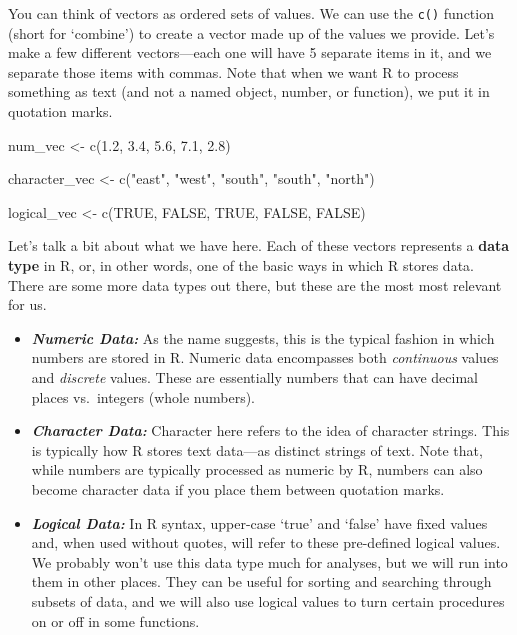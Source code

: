 \documentclass[
  letterpaper,
  DIV=11,
  numbers=noendperiod]{scrreprt}
\newenvironment{Shaded}{\begin{snugshade}}{\end{snugshade}}
\newcommand{\ConstantTok}[1]{\textcolor[rgb]{0.56,0.35,0.01}{#1}}
\newcommand{\FloatTok}[1]{\textcolor[rgb]{0.68,0.00,0.00}{#1}}
\newcommand{\FunctionTok}[1]{\textcolor[rgb]{0.28,0.35,0.67}{#1}}
\newcommand{\NormalTok}[1]{\textcolor[rgb]{0.00,0.23,0.31}{#1}}
\newcommand{\OtherTok}[1]{\textcolor[rgb]{0.00,0.23,0.31}{#1}}
\newcommand{\StringTok}[1]{\textcolor[rgb]{0.13,0.47,0.30}{#1}}
\begin{document}
You can think of vectors as ordered sets of values. We can use the
\texttt{c()} function (short for `combine') to create a vector made up
of the values we provide. Let's make a few different vectors---each one
will have 5 separate items in it, and we separate those items with
commas. Note that when we want R to process something as text (and not a
named object, number, or function), we put it in quotation marks.

\begin{Shaded}
\begin{Highlighting}[]
\NormalTok{num\_vec }\OtherTok{\textless{}{-}} \FunctionTok{c}\NormalTok{(}\FloatTok{1.2}\NormalTok{, }\FloatTok{3.4}\NormalTok{, }\FloatTok{5.6}\NormalTok{, }\FloatTok{7.1}\NormalTok{, }\FloatTok{2.8}\NormalTok{)}

\NormalTok{character\_vec }\OtherTok{\textless{}{-}} \FunctionTok{c}\NormalTok{(}\StringTok{"east"}\NormalTok{, }\StringTok{"west"}\NormalTok{, }\StringTok{"south"}\NormalTok{, }\StringTok{"south"}\NormalTok{, }\StringTok{"north"}\NormalTok{) }

\NormalTok{logical\_vec }\OtherTok{\textless{}{-}} \FunctionTok{c}\NormalTok{(}\ConstantTok{TRUE}\NormalTok{, }\ConstantTok{FALSE}\NormalTok{, }\ConstantTok{TRUE}\NormalTok{, }\ConstantTok{FALSE}\NormalTok{, }\ConstantTok{FALSE}\NormalTok{) }
\end{Highlighting}
\end{Shaded}

Let's talk a bit about what we have here. Each of these vectors
represents a \textbf{data type} in R, or, in other words, one of the
basic ways in which R stores data. There are some more data types out
there, but these are the most most relevant for us.

\begin{itemize}
\item
  \textbf{\emph{Numeric Data:}} As the name suggests, this is the
  typical fashion in which numbers are stored in R. Numeric data
  encompasses both \emph{continuous} values and \emph{discrete} values.
  These are essentially numbers that can have decimal places
  vs.~integers (whole numbers).
\item
  \textbf{\emph{Character Data:}} Character here refers to the idea of
  character strings. This is typically how R stores text data---as
  distinct strings of text. Note that, while numbers are typically
  processed as numeric by R, numbers can also become character data if
  you place them between quotation marks.
\item
  \textbf{\emph{Logical Data:}} In R syntax, upper-case `true' and
  `false' have fixed values and, when used without quotes, will refer to
  these pre-defined logical values. We probably won't use this data type
  much for analyses, but we will run into them in other places. They can
  be useful for sorting and searching through subsets of data, and we
  will also use logical values to turn certain procedures on or off in
  some functions.
\end{itemize}
\end{document}
